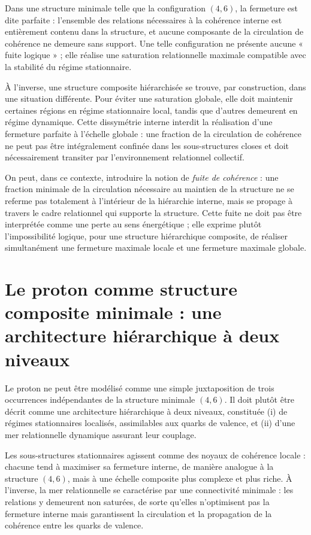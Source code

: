 \documentclass[11pt,a4paper]{article}
\begin{document}
Dans une structure minimale telle que la configuration \(\left(4,6\right)\), la fermeture est dite parfaite : l’ensemble des relations nécessaires à la cohérence interne est entièrement contenu dans la structure, et aucune composante de la circulation de cohérence ne demeure sans support. Une telle configuration ne présente aucune « fuite logique » ; elle réalise une saturation relationnelle maximale compatible avec la stabilité du régime stationnaire.

À l’inverse, une structure composite hiérarchisée se trouve, par construction, dans une situation différente. Pour éviter une saturation globale, elle doit maintenir certaines régions en régime stationnaire local, tandis que d’autres demeurent en régime dynamique. Cette dissymétrie interne interdit la réalisation d’une fermeture parfaite à l’échelle globale : une fraction de la circulation de cohérence ne peut pas être intégralement confinée dans les sous-structures closes et doit nécessairement transiter par l’environnement relationnel collectif.

On peut, dans ce contexte, introduire la notion de \emph{fuite de cohérence} : une fraction minimale de la circulation nécessaire au maintien de la structure ne se referme pas totalement à l’intérieur de la hiérarchie interne, mais se propage à travers le cadre relationnel qui supporte la structure. Cette fuite ne doit pas être interprétée comme une perte au sens énergétique ; elle exprime plutôt l’impossibilité logique, pour une structure hiérarchique composite, de réaliser simultanément une fermeture maximale locale et une fermeture maximale globale.

\section{Le proton comme structure composite minimale : une architecture hiérarchique à deux niveaux}

Le proton ne peut être modélisé comme une simple juxtaposition de trois occurrences indépendantes de la structure minimale \(\left(4,6\right)\). Il doit plutôt être décrit comme une architecture hiérarchique à deux niveaux, constituée (i) de régimes stationnaires localisés, assimilables aux quarks de valence, et (ii) d’une mer relationnelle dynamique assurant leur couplage.

Les sous-structures stationnaires agissent comme des noyaux de cohérence locale : chacune tend à maximiser sa fermeture interne, de manière analogue à la structure \(\left(4,6\right)\), mais à une échelle composite plus complexe et plus riche. À l’inverse, la mer relationnelle se caractérise par une connectivité minimale : les relations y demeurent non saturées, de sorte qu’elles n’optimisent pas la fermeture interne mais garantissent la circulation et la propagation de la cohérence entre les quarks de valence.
\end{document}
